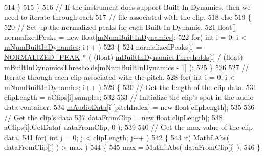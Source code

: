 \begin{DoxyCode}
514             \}
515         \}
516         \textcolor{comment}{// If the instrument does support Built-In Dynamics, then we need to iterate through each}
517         \textcolor{comment}{// file associated with the clip.}
518         \textcolor{keywordflow}{else}
519         \{
520             \textcolor{comment}{// Set up the normalized peaks for each Built-In Dynamic.}
521             \textcolor{keywordtype}{float}[] normalizedPeaks = \textcolor{keyword}{new} \textcolor{keywordtype}{float}[\hyperlink{group___v_i_base_pro_var_gac265f64f759d267ee1e1680f8d387011}{mNumBuiltInDynamics}];
522             \textcolor{keywordflow}{for}( \textcolor{keywordtype}{int} i = 0; i < \hyperlink{group___v_i_base_pro_var_gac265f64f759d267ee1e1680f8d387011}{mNumBuiltInDynamics}; i++ )
523             \{
524                 normalizedPeaks[i] = \hyperlink{group___v_i_base_const_gaf060c000443f92784bd8db8d866d8b2a}{NORMALIZED\_PEAK} * ( (float)
      \hyperlink{group___v_i_base_pro_var_gae3db4264dc2a96e99ea680c6d637e6bf}{mBuiltInDynamicsThresholds}[i] / (\textcolor{keywordtype}{float})
      \hyperlink{group___v_i_base_pro_var_gae3db4264dc2a96e99ea680c6d637e6bf}{mBuiltInDynamicsThresholds}[mNumBuiltInDynamics - 1] );
525             \}
526 
527             \textcolor{comment}{// Iterate through each clip associated with the pitch.}
528             \textcolor{keywordflow}{for}( \textcolor{keywordtype}{int} i = 0; i < \hyperlink{group___v_i_base_pro_var_gac265f64f759d267ee1e1680f8d387011}{mNumBuiltInDynamics}; i++ )
529             \{
530                 \textcolor{comment}{// Get the length of the clip data. }
531                 clipLength = aClips[i].samples;
532 
533                 \textcolor{comment}{// Initialize the clip's spot in the audio data container.}
534                 \hyperlink{group___v_i_base_pro_var_ga52e76d9b74408660584676035a92a2c6}{mAudioData}[i][pitchIndex] = \textcolor{keyword}{new} \textcolor{keywordtype}{float}[clipLength];
535 
536                 \textcolor{comment}{// Get the clip's data}
537                 dataFromClip = \textcolor{keyword}{new} \textcolor{keywordtype}{float}[clipLength];
538                 aClips[i].GetData( dataFromClip, 0 );
539 
540                 \textcolor{comment}{// Get the max value of the clip data.}
541                 \textcolor{keywordflow}{for}( \textcolor{keywordtype}{int} j = 0; j < clipLength; j++ )
542                 \{
543                     \textcolor{keywordflow}{if}( Mathf.Abs( dataFromClip[j] ) > max )
544                     \{
545                         max = Mathf.Abs( dataFromClip[j] );
546                     \}

\end{DoxyCode}
